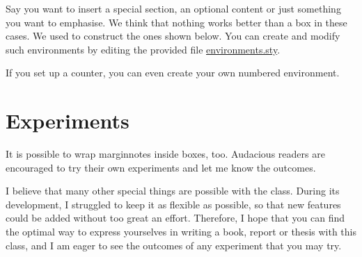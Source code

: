 Say you want to insert a special section, an optional content or just 
something you want to emphasise. We think that nothing works better than 
a box in these cases. We used  to construct the ones 
shown below. You can create and modify such environments by editing the 
provided file \href{style/environments.sty}{environments.sty}.

\begin{kaobox}[frametitle=Title of the box]
\blindtext
\end{kaobox}

If you set up a counter, you can even create your own numbered 
environment.

\begin{kaocounter}
	\blindtext
\end{kaocounter}

\section{Experiments}

It is possible to wrap marginnotes inside boxes, too. Audacious readers 
are encouraged to try their own experiments and let me know the 
outcomes.


I believe that many other special things are possible with the 
 class. During its development, I struggled to keep it as 
flexible as possible, so that new features could be added without too 
great an effort. Therefore, I hope that you can find the optimal way to 
express yourselves in writing a book, report or thesis with this class, 
and I am eager to see the outcomes of any experiment that you may try.

